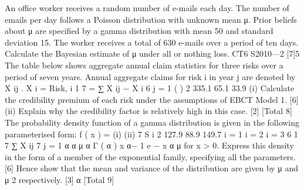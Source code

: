 \documentclass[a4paper,12pt]{article}
\begin{document}
 An office worker receives a random number of e-mails each day. The number of
emails per day follows a Poisson distribution with unknown mean μ. Prior beliefs
about μ are specified by a gamma distribution with mean 50 and standard deviation
15. The worker receives a total of 630 e-mails over a period of ten days.
Calculate the Bayesian estimate of μ under all or nothing loss.
CT6 S2010—2
[7]5
The table below shows aggregate annual claim statistics for three risks over a period
of seven years. Annual aggregate claims for risk i in year j are denoted by X ij .
X i =
Risk, i
1 7
= ∑ X ij − X i
6 j = 1
(
)
2
335.1
65.1
33.9
(i) Calculate the credibility premium of each risk under the assumptions of EBCT
Model 1.
[6]
(ii) Explain why the credibility factor is relatively high in this case.
[2]
[Total 8]
The probability density function of a gamma distribution is given in the following
parameterised form:
f ( x ) =
(i)
(ii)
7
S i 2
127.9
88.9
149.7
i = 1
i = 2
i = 3
6
1 7
∑ X ij
7 j = 1
α α
μ α Γ ( α )
x
α− 1
e
−
x α
μ
for x > 0.
Express this density in the form of a member of the exponential family,
specifying all the parameters.
[6]
Hence show that the mean and variance of the distribution are given by μ and
μ 2
respectively.
[3]
α
[Total 9]
\end{document}
